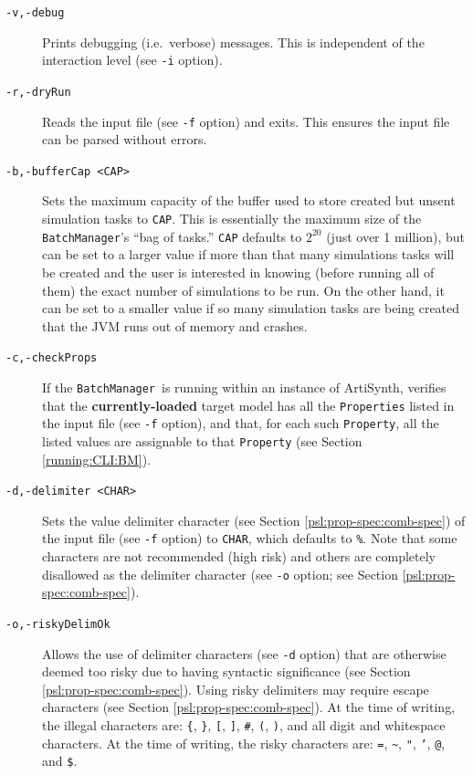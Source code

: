 \documentclass{article}
\newcommand{\BM}{{\tt BatchManager}}
\begin{document}
\begin{description}
\item[{\tt -v,-debug} ] \mbox{}

Prints debugging (i.e.\ verbose) messages. This is independent of the interaction level (see {\tt -i} option).

\item[{\tt -r,-dryRun} ] \mbox{}

Reads the input file (see {\tt -f} option) and exits. This ensures the input file can be parsed without errors.

\item[{\tt -b,-bufferCap <CAP>} ] \mbox{}

Sets the maximum capacity of the buffer used to store created but unsent simulation tasks to {\tt CAP}. This is essentially the maximum size of the \BM's ``bag of tasks.'' {\tt CAP} defaults to $2^{20}$ (just over 1 million), but can be set to a larger value if more than that many simulations tasks will be created and the user is interested in knowing (before running all of them) the exact number of simulations to be run. On the other hand, it can be set to a smaller value if so many simulation tasks are being created that the JVM runs out of memory and crashes.

\item[{\tt -c,-checkProps} ] \mbox{}

If the \BM\ is running within an instance of ArtiSynth, verifies that the \textbf{currently-loaded} target model has all the {\tt Properties} listed in the input file (see {\tt -f} option), and that, for each such {\tt Property}, all the listed values are assignable to that {\tt Property} (see Section \ref{running:CLI:BM}).

\item[{\tt -d,-delimiter <CHAR>} ] \mbox{}

Sets the value delimiter character (see Section \ref{psl:prop-spec:comb-spec}) of the input file (see {\tt -f} option) to {\tt CHAR}, which defaults to {\tt \%}. Note that some characters are not recommended (high risk) and others are completely disallowed as the delimiter character (see {\tt -o} option; see Section \ref{psl:prop-spec:comb-spec}).

\item[{\tt -o,-riskyDelimOk} ] \mbox{}

Allows the use of delimiter characters (see {\tt -d} option) that are otherwise deemed too risky due to having syntactic significance (see Section \ref{psl:prop-spec:comb-spec}). Using risky delimiters may require escape characters (see Section \ref{psl:prop-spec:comb-spec}). At the time of writing, the illegal characters are: {\tt \{}, {\tt \}}, {\tt [}, {\tt ]}, {\tt \#}, {\tt (}, {\tt )}, and all digit and whitespace characters. At the time of writing, the risky characters are: {\tt =}, {\tt \textasciitilde}, {\tt "}, {\tt '}, {\tt @}, and {\tt \$}.


\end{description}
\end{document}
